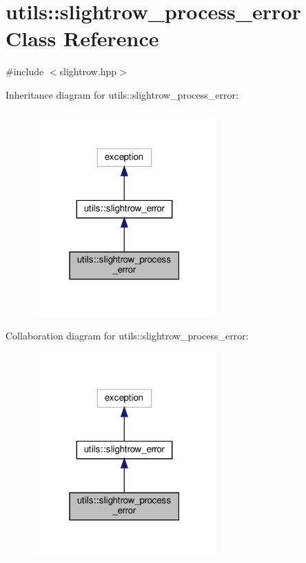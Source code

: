 \hypertarget{classutils_1_1slightrow__process__error}{}\section{utils\+:\+:slightrow\+\_\+process\+\_\+error Class Reference}
\label{classutils_1_1slightrow__process__error}


{\ttfamily \#include $<$slightrow.\+hpp$>$}



Inheritance diagram for utils\+:\+:slightrow\+\_\+process\+\_\+error\+:\nopagebreak
\begin{figure}[H]
\begin{center}
\leavevmode
\includegraphics[width=199pt]{classutils_1_1slightrow__process__error__inherit__graph}
\end{center}
\end{figure}


Collaboration diagram for utils\+:\+:slightrow\+\_\+process\+\_\+error\+:\nopagebreak
\begin{figure}[H]
\begin{center}
\leavevmode
\includegraphics[width=199pt]{classutils_1_1slightrow__process__error__coll__graph}
\end{center}
\end{figure}



